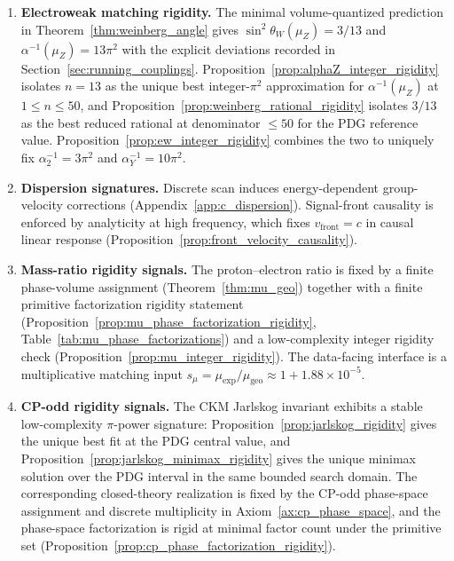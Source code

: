 \begin{enumerate}
    \item \textbf{Electroweak matching rigidity.} The minimal volume-quantized prediction in Theorem~\ref{thm:weinberg_angle} gives $\sin^2\theta_W(\mu_Z)=3/13$ and $\alpha^{-1}(\mu_Z)=13\pi^2$ with the explicit deviations recorded in Section~\ref{sec:running_couplings}. Proposition~\ref{prop:alphaZ_integer_rigidity} isolates $n=13$ as the unique best integer-$\pi^2$ approximation for $\alpha^{-1}(\mu_Z)$ at $1\le n\le 50$, and Proposition~\ref{prop:weinberg_rational_rigidity} isolates $3/13$ as the best reduced rational at denominator $\le 50$ for the PDG reference value. Proposition~\ref{prop:ew_integer_rigidity} combines the two to uniquely fix $\alpha_2^{-1}=3\pi^2$ and $\alpha_Y^{-1}=10\pi^2$.

    \item \textbf{Dispersion signatures.} Discrete scan induces energy-dependent group-velocity corrections (Appendix~\ref{app:c_dispersion}). Signal-front causality is enforced by analyticity at high frequency, which fixes $v_{\mathrm{front}}=c$ in causal linear response (Proposition~\ref{prop:front_velocity_causality}).

    \item \textbf{Mass-ratio rigidity signals.} The proton--electron ratio is fixed by a finite phase-volume assignment (Theorem~\ref{thm:mu_geo}) together with a finite primitive factorization rigidity statement (Proposition~\ref{prop:mu_phase_factorization_rigidity}, Table~\ref{tab:mu_phase_factorizations}) and a low-complexity integer rigidity check (Proposition~\ref{prop:mu_integer_rigidity}). The data-facing interface is a multiplicative matching input $s_\mu=\mu_{\mathrm{exp}}/\mu_{\mathrm{geo}}\approx 1+1.88\times 10^{-5}$.

    \item \textbf{CP-odd rigidity signals.} The CKM Jarlskog invariant exhibits a stable low-complexity $\pi$-power signature: Proposition~\ref{prop:jarlskog_rigidity} gives the unique best fit at the PDG central value, and Proposition~\ref{prop:jarlskog_minimax_rigidity} gives the unique minimax solution over the PDG interval in the same bounded search domain. The corresponding closed-theory realization is fixed by the CP-odd phase-space assignment and discrete multiplicity in Axiom~\ref{ax:cp_phase_space}, and the phase-space factorization is rigid at minimal factor count under the primitive set (Proposition~\ref{prop:cp_phase_factorization_rigidity}).


\end{enumerate}
